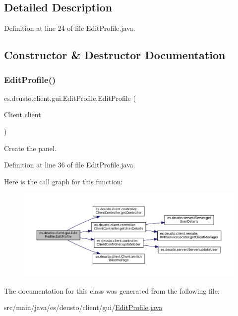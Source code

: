 \subsection{Detailed Description}


Definition at line 24 of file Edit\+Profile.\+java.



\subsection{Constructor \& Destructor Documentation}
\mbox{\label{classes_1_1deusto_1_1client_1_1gui_1_1_edit_profile_a0302d5f1a2df66b4e4ce357ec32015bd}} 
\subsubsection{\texorpdfstring{EditProfile()}{EditProfile()}}
{\footnotesize\ttfamily es.\+deusto.\+client.\+gui.\+Edit\+Profile.\+Edit\+Profile (\begin{DoxyParamCaption}\item[{\mbox{\hyperlink{classes_1_1deusto_1_1client_1_1_client}{Client}}}]{client }\end{DoxyParamCaption})}

Create the panel. 

Definition at line 36 of file Edit\+Profile.\+java.

Here is the call graph for this function\+:
\nopagebreak
\begin{figure}[H]
\begin{center}
\leavevmode
\includegraphics[width=350pt]{classes_1_1deusto_1_1client_1_1gui_1_1_edit_profile_a0302d5f1a2df66b4e4ce357ec32015bd_cgraph}
\end{center}
\end{figure}


The documentation for this class was generated from the following file\+:\begin{DoxyCompactItemize}
\item 
src/main/java/es/deusto/client/gui/\mbox{\hyperlink{_edit_profile_8java}{Edit\+Profile.\+java}}\end{DoxyCompactItemize}
